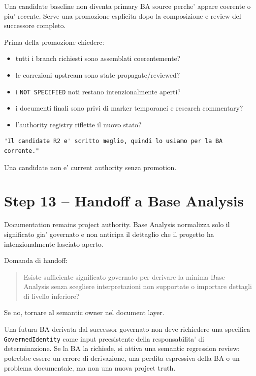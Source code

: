 \documentclass[11pt,a4paper]{article}
\newcommand{\code}[1]{\texttt{#1}}
\begin{document}
\begin{statusclosed}
Una candidate baseline non diventa primary BA source perche' appare coerente o piu' recente. Serve una promozione esplicita dopo la composizione e review del successore completo.
\end{statusclosed}

Prima della promozione chiedere:

\begin{itemize}
\item tutti i branch richiesti sono assemblati coerentemente?
\item le correzioni upstream sono state propagate/reviewed?
\item i \code{NOT SPECIFIED} noti restano intenzionalmente aperti?
\item i documenti finali sono privi di marker temporanei e research commentary?
\item l'authority registry riflette il nuovo stato?
\end{itemize}

\begin{badbox}
\begin{lstlisting}
"Il candidate R2 e' scritto meglio, quindi lo usiamo per la BA corrente."
\end{lstlisting}
Una candidate non e' current authority senza promotion.
\end{badbox}

\section{Step 13 -- Handoff a Base Analysis}

\begin{statusclosed}
Documentation remains project authority. Base Analysis normalizza solo il significato gia' governato e non anticipa il dettaglio che il progetto ha intenzionalmente lasciato aperto.
\end{statusclosed}

Domanda di handoff:

\begin{quote}
Esiste sufficiente significato governato per derivare la minima Base Analysis senza scegliere interpretazioni non supportate o importare dettagli di livello inferiore?
\end{quote}

Se no, tornare al semantic owner nel document layer.

\begin{examplebox}[MR-0003 -- BA boundary]
Una futura BA derivata dal successor governato non deve richiedere una specifica \code{GovernedIdentity} come input preesistente della responsabilita' di determinazione. Se la BA la richiede, si attiva una semantic regression review: potrebbe essere un errore di derivazione, una perdita espressiva della BA o un problema documentale, ma non una nuova project truth.
\end{examplebox}
\end{document}
